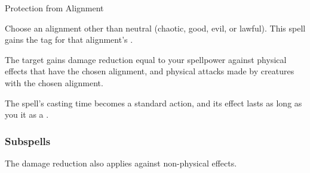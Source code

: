 \newpage
\begin{spellsection}{Protection from Alignment}

\begin{spellcontent}

\begin{spelltargetinginfo}



\end{spelltargetinginfo}


\begin{spelleffects}
\spellspecial
Choose an alignment other than neutral (chaotic, good, evil, or lawful).
This spell gains the tag for that alignment's .



\spelleffect
The target gains damage reduction equal to your spellpower against physical effects that have the chosen alignment, and physical attacks made by creatures with the chosen alignment.








\end{spelleffects}

\end{spellcontent}
\begin{spellfooter}


\end{spellfooter}
\begin{spellsubcontent}


\begin{spellcantrip}
The spell's casting time becomes a standard action, and its effect lasts as long as you  it as a .
\end{spellcantrip}


\end{spellsubcontent}
\end{spellsection}


\subsubsection{Subspells}



The damage reduction also applies against non-physical effects.






